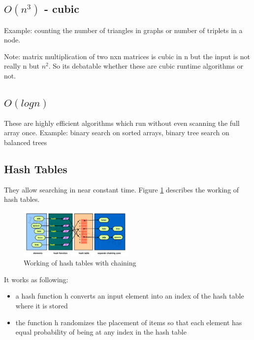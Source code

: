 \subsection{$O(n^3)$ - cubic}
Example: counting the number of triangles in graphs or number of triplets in a node.

Note: matrix multiplication of two nxn matrices is cubic in n but the input is not really n but $n^2$. So its debatable whether these are cubic runtime algorithms or not.

\subsection{$O(logn)$}
These are highly efficient algorithms which run without even scanning the full array once. Example: binary search on sorted arrays, binary tree search on balanced trees

\subsection{Hash Tables}
They allow searching in near constant time. Figure \ref{fig:hash_table} describes the working of hash tables.

\begin{figure}[ht]
  \begin{center}
    \includegraphics[width=0.5\textwidth]{figures/hash_table.png}
    \caption{Working of hash tables with chaining \protect\footnotemark}
    \label{fig:hash_table}
  \end{center}
\end{figure}

It works as following:
\begin{itemize}
    \item a hash function h converts an input element into an index of the hash table where it is stored
    \item the function h randomizes the placement of items so that each element has equal probability of being at any index in the hash table
\end{itemize}

